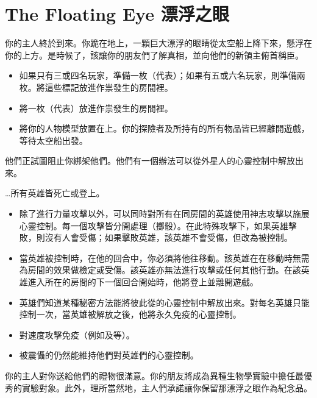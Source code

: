 
\chapter{The Floating Eye 漂浮之眼}

\begin{HauntStory}
  你的主人終於到來。你跪在地上，一顆巨大漂浮的眼睛從太空船上降下來，懸浮在你的上方。是時候了，該讓你的朋友們了解真相，並向他們的新領主俯首稱臣。
\end{HauntStory}

\vspace*{-1em}
\begin{itemize}
  \item 如果只有三或四名玩家，準備一枚（代表）；如果有五或六名玩家，則準備兩枚。將這些標記放進作祟發生的房間裡。
  \item 將一枚（代表）放進作祟發生的房間裡。
  \item 將你的人物模型放置在上。你的探險者及所持有的所有物品皆已經離開遊戲，等待太空船出發。
\end{itemize}

他們正試圖阻止你綁架他們。他們有一個辦法可以從外星人的心靈控制中解放出來。

…所有英雄皆死亡或登上。

\vfill\null\pagebreak


\vspace*{-1em}
\begin{itemize}
  \item 除了進行力量攻擊以外，可以同時對所有在同房間的英雄使用神志攻擊以施展心靈控制。每一個攻擊皆分開處理（擲骰）。在此特殊攻擊下，如果英雄擊敗，則沒有人會受傷；如果擊敗英雄，該英雄不會受傷，但改為被控制。
  \item 當英雄被控制時，在他的回合中，你必須將他往移動。該英雄在在移動時無需為房間的效果做檢定或受傷。該英雄亦無法進行攻擊或任何其他行動。在該英雄進入所在的房間的下一個回合開始時，他將登上並離開遊戲。
  \item 英雄們知道某種秘密方法能將彼此從的心靈控制中解放出來。對每名英雄只能控制一次，當英雄被解放之後，他將永久免疫的心靈控制。
  \item {}對速度攻擊免疫（例如及等）。
  \item 被震懾的仍然能維持他們對英雄們的心靈控制。
\end{itemize}

\begin{HauntStory}
  你的主人對你送給他們的禮物很滿意。你的朋友將成為異種生物學實驗中擔任最優秀的實驗對象。此外，理所當然地，主人們承諾讓你保留那漂浮之眼作為紀念品。
\end{HauntStory}
